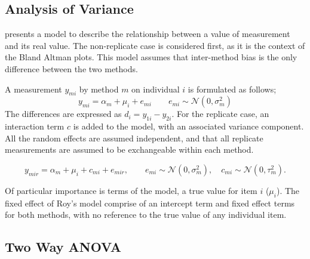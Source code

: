 \documentclass[12pt, a4paper]{report}
\theoremstyle{plain}
\theoremstyle{definition}
\theoremstyle{remark}
\begin{document}
	\subsection{Analysis of Variance }
	
	\citet{BXC2004} presents a model to describe the relationship between a value of measurement and its
	real value. The non-replicate case is considered first, as it is the context of the Bland Altman plots. This model assumes that inter-method bias is the only difference between the two methods.
	
	A measurement $y_{mi}$ by method $m$ on individual $i$ is formulated as follows;
	\begin{equation}
	y_{mi}  = \alpha_{m} + \mu_{i} + e_{mi} \qquad  e_{mi} \sim
	\mathcal{N}(0,\sigma^{2}_{m})
	\end{equation}
	The differences are expressed as $d_{i} = y_{1i} - y_{2i}$. For the replicate case, an interaction term $c$ is added to the model, with an associated variance component. All the random effects are assumed independent, and that all replicate measurements are assumed to be exchangeable within each method.
	
	\begin{equation}
	y_{mir}  = \alpha_{m} + \mu_{i} + c_{mi} + e_{mir}, \qquad  e_{mi}
	\sim \mathcal{N}(0,\sigma^{2}_{m}), \quad c_{mi} \sim \mathcal{N}(0,\tau^{2}_{m}).
	\end{equation}
	
	Of particular importance is terms of the model, a true value for item $i$ ($\mu_{i}$).  The fixed effect of Roy's model comprise of an intercept term and fixed effect terms for both methods, with no reference to the true value of any individual item. 

	

		\subsection{Two Way ANOVA}
		
\end{document}
